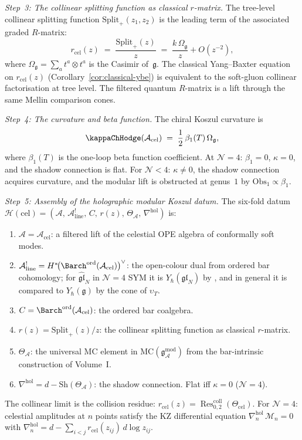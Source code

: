 \begin{construction}
\emph{Step~3: The collinear splitting function as classical
$r$-matrix.}
The tree-level collinear splitting function
$\mathrm{Split}_{+}(z_1,z_2)$ is the leading term
of the associated graded $R$-matrix:
\[
r_{\mathrm{cel}}(z)
\;=\;
\frac{\mathrm{Split}_{+}(z)}{z}
\;=\;
\frac{k\,\Omega_{\mathfrak{g}}}{z}+O(z^{-2}), %
\]
where $\Omega_{\mathfrak{g}}=\sum_a t^a\otimes t^a$ is the
Casimir of~$\mathfrak{g}$. The classical Yang--Baxter
equation on $r_{\mathrm{cel}}(z)$
(Corollary~\ref{cor:classical-ybe}) is equivalent to the
soft-gluon collinear factorisation at tree level. The filtered quantum $R$-matrix is a
lift through the same Mellin comparison cones.

\emph{Step~4: The curvature and beta function.}
The chiral Koszul curvature is
\[
\kappaChHodge(\mathcal{A}_{\mathrm{cel}})
\;=\;
\frac{1}{2}\,\beta_1(T)\,\Omega_{\mathfrak{g}},
\]
where $\beta_1(T)$ is the one-loop beta function
coefficient. At $\mathcal{N}=4$: $\beta_1=0$,
$\kappa=0$, and the shadow connection is flat. For
$\mathcal{N}<4$: $\kappa\neq 0$, the shadow connection
acquires curvature, and the modular lift is obstructed
at genus~$1$ by $\mathrm{Obs}_1\propto\beta_1$.

\emph{Step~5: Assembly of the holographic modular Koszul datum.}
The six-fold datum
$\mathcal{H}(\mathrm{cel})
=(\mathcal{A},\,\mathcal{A}^!_{\mathrm{line}},\,C,\,r(z),\,
\Theta_{\mathcal{A}},\,\nabla^{\mathrm{hol}})$
is:
\begin{enumerate}[label=\textup{(\roman*)}]
\item $\mathcal{A}=\mathcal{A}_{\mathrm{cel}}$: a filtered lift of the celestial
 OPE algebra of conformally soft modes.
\item $\mathcal{A}^!_{\mathrm{line}}
 =H^*\!\bigl({\Barch}^{\mathrm{ord}}(\mathcal{A}_{\mathrm{cel}})\bigr)^\vee$:
 the open-colour dual from ordered bar cohomology; for
 $\widehat{\mathfrak{gl}}_N$ in $\mathcal{N}=4$ SYM it is
 $Y_\hbar(\mathfrak{gl}_N)$ by \cite{Cos13}, and in general it is compared to
 $Y_\hbar(\mathfrak g)$ by the cone of $\upsilon_T$.
\item $C={\Barch}^{\mathrm{ord}}(\mathcal{A}_{\mathrm{cel}})$:
 the ordered bar coalgebra.
\item $r(z)=\mathrm{Split}_{+}(z)/z$: the collinear
 splitting function as classical $r$-matrix.
\item $\Theta_{\mathcal{A}}$: the universal MC element in
 $\mathrm{MC}(\mathfrak{g}^{\mathrm{mod}}_{\mathcal{A}})$
 from the bar-intrinsic construction of Volume~I.
\item $\nabla^{\mathrm{hol}}=d-\mathrm{Sh}(\Theta_{\mathcal{A}})$:
 the shadow connection. Flat iff $\kappa=0$
 ($\mathcal N=4$).
\end{enumerate}
The collinear limit is the collision residue:
$r_{\mathrm{cel}}(z)
=\operatorname{Res}^{\mathrm{coll}}_{0,2}
(\Theta_{\mathrm{cel}})$.
For $\mathcal{N}=4$: celestial amplitudes at $n$ points
satisfy the KZ differential equation
$\nabla^{\mathrm{hol}}_n\,\mathcal{M}_n=0$
with $\nabla^{\mathrm{hol}}_n
=d-\sum_{i<j}r_{\mathrm{cel}}(z_{ij})\,d\log z_{ij}$.
\end{construction}

